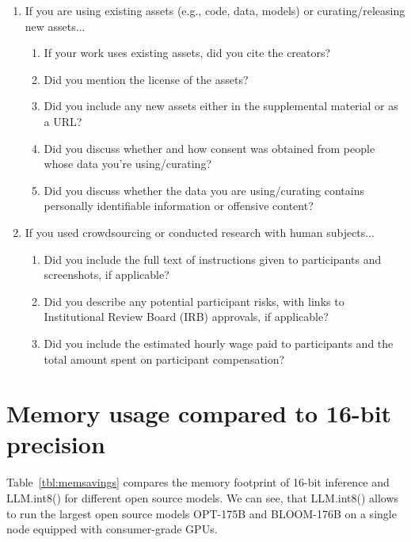 \documentclass{article}
\begin{document}
\begin{enumerate}
\item If you are using existing assets (e.g., code, data, models) or curating/releasing new assets...
\begin{enumerate}
  \item If your work uses existing assets, did you cite the creators?
  \item Did you mention the license of the assets?
  \item Did you include any new assets either in the supplemental material or as a URL?
  \item Did you discuss whether and how consent was obtained from people whose data you're using/curating?
    \answerNA{}{}
  \item Did you discuss whether the data you are using/curating contains personally identifiable information or offensive content?
    \answerNA{}{}
\end{enumerate}


\item If you used crowdsourcing or conducted research with human subjects...
\begin{enumerate}
  \item Did you include the full text of instructions given to participants and screenshots, if applicable?
    \answerNA{}{}
  \item Did you describe any potential participant risks, with links to Institutional Review Board (IRB) approvals, if applicable?
    \answerNA{}{}
  \item Did you include the estimated hourly wage paid to participants and the total amount spent on participant compensation?
    \answerNA{}{}
\end{enumerate}


\end{enumerate}


\newpage
\appendix

\section{Memory usage compared to 16-bit precision}

Table~\ref{tbl:memsavings} compares the memory footprint of 16-bit inference and LLM.int8() for different open source models. We can see, that LLM.int8() allows to run the largest open source models OPT-175B and BLOOM-176B on a single node equipped with consumer-grade GPUs.
\end{document}

